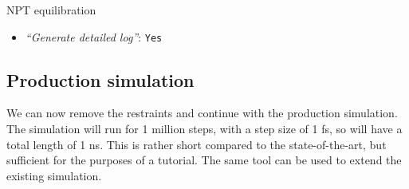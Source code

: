 \documentclass[twocolumn]{bmcart}%
\providecommand{\tightlist}{%
  \setlength{\itemsep}{0pt}\setlength{\parskip}{0pt}}
\begin{document}
\begin{handson_box_colour}{NPT
equilibration}
\begin{itemize}
\begin{itemize}
      \begin{itemize}
      \tightlist
      \item
        \emph{``Bond constraints (constraints)''}:
        \texttt{All\ bonds\ (all-bonds).}
      \item
        \emph{``Temperature /K''}: \texttt{300}
      \item
        \emph{``Step length in ps''}: \texttt{0.002}
      \item
        \emph{``Number of steps that elapse between saving data points
        (velocities, forces, energies)''}: \texttt{1000}
      \item
        \emph{``Number of steps for the simulation''}: \texttt{50000}
      \end{itemize}
    \end{itemize}
  \item
    \emph{``Generate detailed log''}: \texttt{Yes}
  \end{itemize}

\end{handson_box_colour}


\subsection*{Production simulation}\label{production-simulation}

We can now remove the restraints and continue with the production simulation. The simulation will run for 1 million steps, with a step size of 1 fs, so will have a total length of 1 ns. This is rather short compared to the state-of-the-art, but sufficient for the purposes of a tutorial. The same tool can be used to extend the existing simulation.
\end{document}
